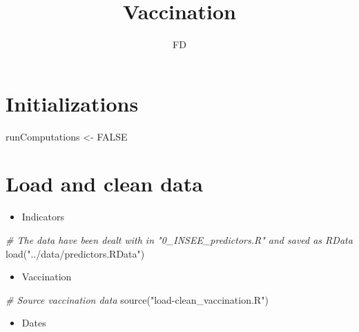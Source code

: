 \documentclass[
]{article}
\title{Vaccination}
\author{FD}
\date{}
\newenvironment{Shaded}{\begin{snugshade}}{\end{snugshade}}
\newcommand{\CommentTok}[1]{\textcolor[rgb]{0.56,0.35,0.01}{\textit{#1}}}
\newcommand{\ConstantTok}[1]{\textcolor[rgb]{0.00,0.00,0.00}{#1}}
\newcommand{\FunctionTok}[1]{\textcolor[rgb]{0.00,0.00,0.00}{#1}}
\newcommand{\NormalTok}[1]{#1}
\newcommand{\OtherTok}[1]{\textcolor[rgb]{0.56,0.35,0.01}{#1}}
\newcommand{\StringTok}[1]{\textcolor[rgb]{0.31,0.60,0.02}{#1}}
\providecommand{\tightlist}{%
  \setlength{\itemsep}{0pt}\setlength{\parskip}{0pt}}
\begin{document}
\maketitle

\hypertarget{initializations}{%
\section{Initializations}\label{initializations}}

\begin{Shaded}
\begin{Highlighting}[]
\NormalTok{runComputations }\OtherTok{\textless{}{-}} \ConstantTok{FALSE}
\end{Highlighting}
\end{Shaded}

\hypertarget{load-and-clean-data}{%
\section{Load and clean data}\label{load-and-clean-data}}

\begin{itemize}
\tightlist
\item
  Indicators
\end{itemize}

\begin{Shaded}
\begin{Highlighting}[]
\CommentTok{\# The data have been dealt with in "0\_INSEE\_predictors.R" and saved as RData}
\FunctionTok{load}\NormalTok{(}\StringTok{"../data/predictors.RData"}\NormalTok{)}
\end{Highlighting}
\end{Shaded}

\begin{itemize}
\tightlist
\item
  Vaccination
\end{itemize}

\begin{Shaded}
\begin{Highlighting}[]
\CommentTok{\# Source vaccination data}
\FunctionTok{source}\NormalTok{(}\StringTok{"load{-}clean\_vaccination.R"}\NormalTok{)}
\end{Highlighting}
\end{Shaded}

\begin{itemize}
\tightlist
\item
  Dates
\end{itemize}
\end{document}

